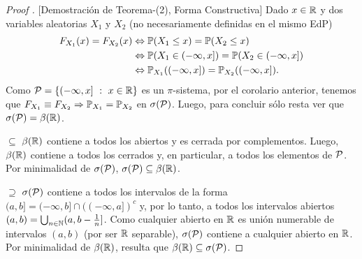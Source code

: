 \begin{proof}[Proof ][Demostración de Teorema-(2), Forma Constructiva]
	Dado $x \in \mathbb{R}$ y dos variables aleatorias $X_{1}$ y $X_{2}$ (no necesariamente definidas en el mismo EdP)
	\begin{align*}
		F_{X_{1}}(x) = F_{X_{2}}(x) &\Leftrightarrow \mathbb{P}(X_{1} \leq x) = \mathbb{P}(X_{2} \leq x) \\
		&\Leftrightarrow \mathbb{P}(X_{1} \in (-\infty,x]) = \mathbb{P}(X_{2} \in (-\infty,x]) \\
		&\Leftrightarrow \mathbb{P}_{X_{1}}((-\infty,x]) = \mathbb{P}_{X_{2}}((-\infty,x])
	.\end{align*}
	Como $\mathcal{P} = \{(-\infty,x] \ : \ x \in \mathbb{R}\}$ es un $\pi$-sistema, por el corolario anterior, tenemos que $F_{X_{1}} \equiv F_{X_{2}} \Rightarrow \mathbb{P}_{X_{1}} = \mathbb{P}_{X_{2}}$ en $\sigma(\mathcal{P})$. Luego, para concluir sólo resta ver que $\sigma(\mathcal{P}) = \beta(\mathbb{R})$. \par
	$\boxed{\subseteq}$ $\beta(\mathbb{R})$ contiene a todos los abiertos y es cerrada por complementos. Luego, $\beta(\mathbb{R})$ contiene a todos los cerrados y, en particular, a todos los elementos de $\mathcal{P}$. Por minimalidad de $\sigma(\mathcal{P})$, $\sigma(\mathcal{P}) \subseteq \beta(\mathbb{R})$. \par
	$\boxed{\supseteq}$ $\sigma(\mathcal{P})$ contiene a todos los intervalos de la forma $(a,b] = (-\infty, b] \cap ((-\infty, a])^{c}$ y, por lo tanto, a todos los intervalos abiertos $(a,b) = \bigcup_{n \in \mathbb{N}} (a,b - \frac{1}{n}]$. Como cualquier abierto en $\mathbb{R}$ es unión numerable de intervalos $(a,b)$ (por ser $\mathbb{R}$ separable), $\sigma(\mathcal{P})$ contiene a cualquier abierto en $\mathbb{R}$. Por minimalidad de $\beta(\mathbb{R})$, resulta que $\beta(\mathbb{R}) \subseteq \sigma(\mathcal{P})$.
\end{proof}
